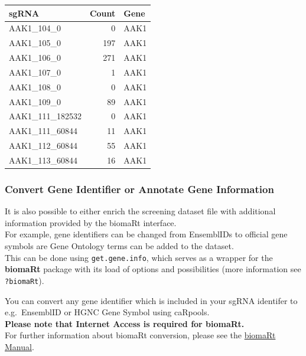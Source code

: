 \documentclass[]{article}
\begin{document}
\begin{longtable}[c]{@{}lrl@{}}
\toprule
sgRNA & Count & Gene\tabularnewline
\midrule
\endhead
AAK1\_104\_0 & 0 & AAK1\tabularnewline
AAK1\_105\_0 & 197 & AAK1\tabularnewline
AAK1\_106\_0 & 271 & AAK1\tabularnewline
AAK1\_107\_0 & 1 & AAK1\tabularnewline
AAK1\_108\_0 & 0 & AAK1\tabularnewline
AAK1\_109\_0 & 89 & AAK1\tabularnewline
AAK1\_111\_182532 & 0 & AAK1\tabularnewline
AAK1\_111\_60844 & 11 & AAK1\tabularnewline
AAK1\_112\_60844 & 55 & AAK1\tabularnewline
AAK1\_113\_60844 & 16 & AAK1\tabularnewline
\bottomrule
\end{longtable}

\subsubsection{Convert Gene Identifier or Annotate Gene
Information}\label{convert-gene-identifier-or-annotate-gene-information}

It is also possible to either enrich the screening dataset file with
additional information provided by the biomaRt interface.\\
For example, gene identifiers can be changed from EnsemblIDs to official
gene symbols are Gene Ontology terms can be added to the dataset.\\
This can be done using \texttt{get.gene.info}, which serves as a wrapper
for the \textbf{biomaRt} package with its load of options and
possibilities (more information see \texttt{?biomaRt}).

You can convert any gene identifier which is included in your sgRNA
identifer to e.g.~EnsemblID or HGNC Gene Symbol using caRpools.\\
\textbf{Please note that Internet Access is required for biomaRt.}\\
For further information about biomaRt conversion, please see the
\href{www.bioconductor.org/packages/release/bioc/vignettes/biomaRt/inst/doc/biomaRt.pdf}{biomaRt
Manual}.
\end{document}
